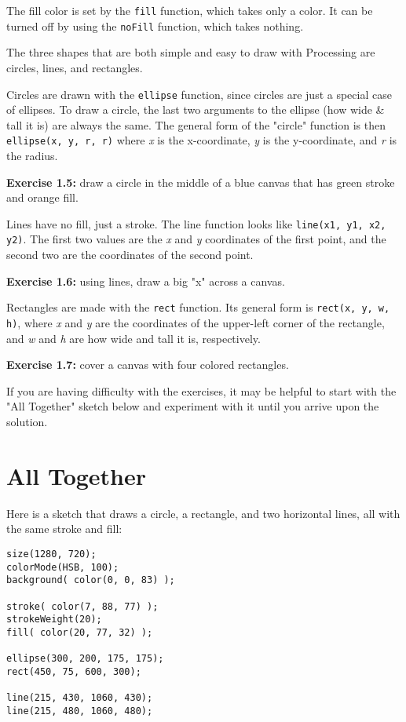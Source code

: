\documentclass[
]{leaflet}
\begin{document}
The fill color is set by the \texttt{fill} function, which takes only a color.
It can be turned off by using the \texttt{noFill} function, which takes nothing.

The three shapes that are both simple and easy to draw with Processing are circles, lines, and rectangles.

Circles are drawn with the \texttt{ellipse} function, since circles are just a special case of ellipses.
To draw a circle, the last two arguments to the ellipse (how wide \& tall it is) are always the same.
The general form of the "circle" function is then \texttt{ellipse(x, y, r, r)} where \textit{x} is the x-coordinate, \textit{y} is the y-coordinate, and \textit{r} is the radius.

\textbf{Exercise 1.5:} draw a circle in the middle of a blue canvas that has green stroke and orange fill.

Lines have no fill, just a stroke.
The line function looks like \texttt{line(x1, y1, x2, y2)}.
The first two values are the \textit{x} and \textit{y} coordinates of the first point, and the second two are the coordinates of the second point.

\textbf{Exercise 1.6:} using lines, draw a big "x" across a canvas.

Rectangles are made with the \texttt{rect} function.
Its general form is \texttt{rect(x, y, w, h)}, where \textit{x} and \textit{y} are the coordinates of the upper-left corner of the rectangle, and \textit{w} and \textit{h} are how wide and tall it is, respectively.

\textbf{Exercise 1.7:} cover a canvas with four colored rectangles.

If you are having difficulty with the exercises, it may be helpful to start with the "All Together" sketch below and experiment with it until you arrive upon the solution.

\vspace{-0.5em}

\section{All Together}

Here is a sketch that draws a circle, a rectangle, and two horizontal lines, all with the same stroke and fill:

\begin{lstlisting}
size(1280, 720);
colorMode(HSB, 100);
background( color(0, 0, 83) );

stroke( color(7, 88, 77) );
strokeWeight(20);
fill( color(20, 77, 32) );

ellipse(300, 200, 175, 175);
rect(450, 75, 600, 300);

line(215, 430, 1060, 430);
line(215, 480, 1060, 480);
\end{lstlisting}
\end{document}
